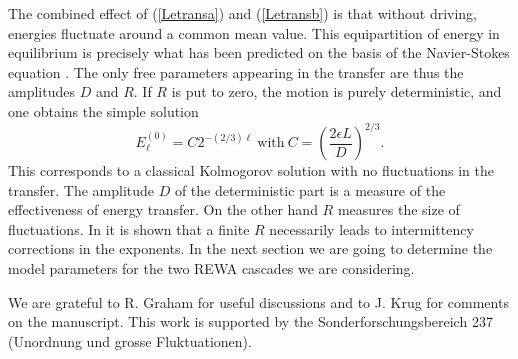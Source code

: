 \documentclass[dc]{svjour}
\begin{document}
The combined effect of (\ref{Letransa}) and (\ref{Letransb}) is
that without driving, energies fluctuate around a common mean value.
This equipartition of energy in equilibrium is precisely
what has been predicted on the basis of the Navier-Stokes
equation \cite{kraichnan73,orszag73}.
The only free parameters appearing in the transfer are thus the
amplitudes $D$ and $R$. If $R$ is put to zero, the motion is
purely deterministic, and one obtains the simple solution
\begin{equation}
  \label{statenerg}
  E_{\ell}^{(0)}=C 2^{-(2/3)\ell}\ \mbox{with}\
           C=\left(\frac{2\epsilon L}{D}\right)^{2/3}.
\end{equation}
This corresponds to a classical Kolmogorov solution with no
fluctuations in the transfer. The amplitude $D$ of the deterministic
part is a measure of the effectiveness of energy transfer. On the other
hand $R$ measures the size of fluctuations. In \cite{eggers94}
it is shown that a finite $R$ necessarily leads to intermittency
corrections in the exponents. In the next section we are going to
determine the model parameters for the two REWA cascades we are
considering.



\begin{acknowledgement}
We are grateful to R. Graham for useful discussions and to
J. Krug for comments on the manuscript.
This work is supported by the Sonderforschungsbereich 237 (Unordnung und
grosse Fluktuationen).
\end{acknowledgement}


\end{document}
